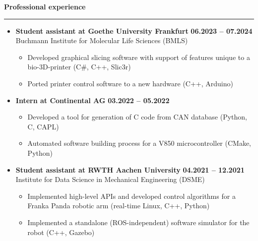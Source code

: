 \documentclass[12pt]{article} %
\newcommand{\HighlightedText}[1] {{\textbf{#1}}}
\newcommand{\PlaceAndTime}[2] {\HighlightedText{#1} \hfill \HighlightedText{#2}}
\newenvironment{ItemizeSection}[1]{
    \vspace{1mm}
    \HighlightedText{#1}
    \vspace{0.5mm}
    {\color{custom_blue} \hrule}
    \begin{itemize}[left=0.5em, topsep=0pt, itemsep=0pt, label={$\bullet$}]
}{
    \end{itemize}
}
\newenvironment{ItemizeSubsection}{
    \begin{itemize}[left=0.5em, topsep=-999pt, itemsep=0pt, label={$\circ$}]
}{
    \end{itemize}
}
\begin{document}
\begin{ItemizeSection}{Professional experience}
    \item \PlaceAndTime{Student assistant at Goethe University Frankfurt}{06.2023 -- 07.2024} \\
    Buchmann Institute for Molecular Life Sciences (BMLS)
    \begin{ItemizeSubsection}
        \item Developed graphical slicing software with support of features unique to a bio-3D-printer (C\#, C++, Slic3r)
        \item Ported printer control software to a new hardware (C++, Arduino)
    \end{ItemizeSubsection}

    \item \PlaceAndTime{Intern at Continental AG}{03.2022 -- 05.2022}
    \begin{ItemizeSubsection}
        \item Developed a tool for generation of C code from CAN database (Python, C, CAPL)
        \item Automated software building process for a V850 microcontroller (CMake, Python)
    \end{ItemizeSubsection}

    \item \PlaceAndTime{Student assistant at RWTH Aachen University}{04.2021 -- 12.2021} \\
    Institute for Data Science in Mechanical Engineering (DSME)
    \begin{ItemizeSubsection}
        \item Implemented high-level APIs and developed control algorithms for a Franka Panda robotic arm (real-time Linux, C++, Python)
        \item Implemented a standalone (ROS-independent) software simulator for the robot (C++, Gazebo)
    \end{ItemizeSubsection}
\end{ItemizeSection}
\end{document}
